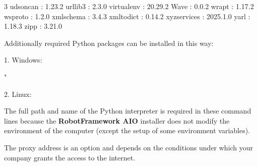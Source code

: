 \begin{multicols}{3}
udsoncan : 1.23.2\newline
urllib3 : 2.3.0\newline
virtualenv : 20.29.2\newline
Wave : 0.0.2\newline
wrapt : 1.17.2\newline
wsproto : 1.2.0\newline
xmlschema : 3.4.3\newline
xmltodict : 0.14.2\newline
xyzservices : 2025.1.0\newline
yarl : 1.18.3\newline
zipp : 3.21.0\newline
\end{multicols}

\vspace{2ex}

Additionally required Python packages can be installed in this way:

\vspace{2ex}

1. Windows:

\begin{pythoncode}
"%
\end{pythoncode}

\vspace{2ex}

2. Linux:


\vspace{2ex}

The full path and name of the Python interpreter is required in these command lines because the \textbf{RobotFramework AIO} installer does not modify the environment of the computer (except the setup of some environment variables).

The proxy address is an option and depends on the conditions under which your company grants the access to the internet.


